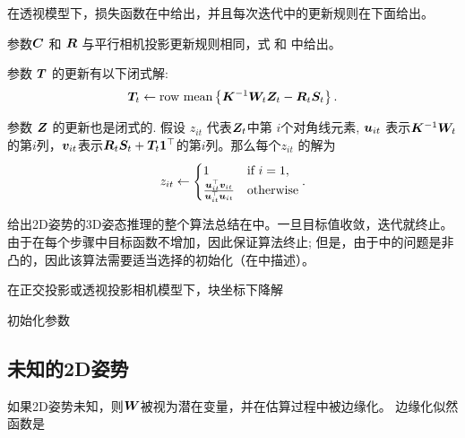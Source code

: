 在透视模型下，损失函数在中给出，并且每次迭代中的更新规则在下面给出。

参数${\bm{C}}$ 和 ${\bm{R}}$ 与平行相机投影更新规则相同，式 和 中给出。

参数 ${\bm{T}}$ 的更新有以下闭式解:
\begin{align}\label{eq:T-step-fp}
{\bm{T}}_t \leftarrow \mbox{row mean}\left\{{\bm{K}}^{-1}{\bm{W}}_t{\bm{Z}}_t - {\bm{R}}_t{\bm{S}}_t\right\}.
\end{align}

参数 ${\bm{Z}}$ 的更新也是闭式的. 假设 $z_{it}$ 代表${\bm{Z}}_t$中第 $i$个对角线元素, ${\bm{u}}_{it}$ 表示${\bm{K}}^{-1}{\bm{W}}_t$的第$i$列，${\bm{v}}_{it}$表示${\bm{R}}_t{\bm{S}}_t+{\bm{T}}_t{\bm{1}}^\top$的第$i$列。那么每个$z_{it}$ 的解为 
\begin{align}\label{eq:Z-step}
z_{it}\leftarrow 
\begin{cases}
     1 & \mbox{if $i=1$}, \\
    \frac{{\bm{u}}_{it}^\top{\bm{v}}_{it}}{{\bm{u}}_{it}^\top{\bm{u}}_{it}} & \mbox{otherwise}
\end{cases}.
\end{align}

给出2D姿势的3D姿态推理的整个算法总结在中。一旦目标值收敛，迭代就终止。由于在每个步骤中目标函数不增加，因此保证算法终止; 但是，由于中的问题是非凸的，因此该算法需要适当选择的初始化（在中描述）。

\begin{algorithm}[t]\label{alg:bcd}
\LinesNumbered
\caption{在正交投影或透视投影相机模型下，块坐标下降解}
\vspace{0.3em}
\vspace{0.3em}
初始化参数 
\end{algorithm}

\subsection{未知的2D姿势}\label{sec:unknown}

如果2D姿势未知，则${\bm{W}}$被视为潜在变量，并在估算过程中被边缘化。 边缘化似然函数是

